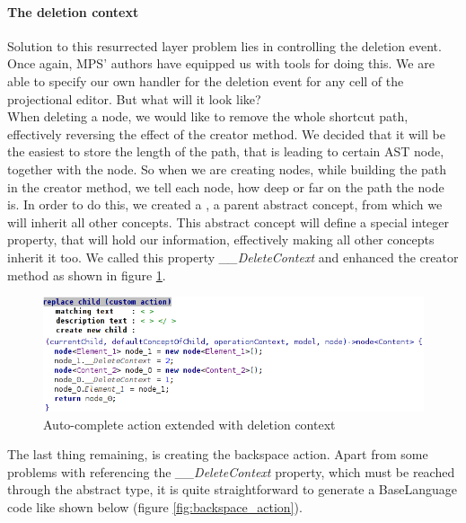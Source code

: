 \paragraph {The deletion context}

Solution to this resurrected layer problem lies in controlling the deletion event.
Once again, MPS' authors have equipped us with tools for doing this.
We are able to specify our own handler for the deletion event for any cell of the projectional editor.
But what will it look like?
\\

When deleting a node, we would like to remove the whole shortcut path, effectively reversing the effect of the creator method.
We decided that it will be the easiest to store the length of the path, that is leading to certain AST node, together with the node.
So when we are creating nodes, while building the path in the creator method, we tell each node, how deep or far on the path the node is.
In order to do this, we created a , a parent abstract concept, from which we will inherit all other concepts.
This abstract concept will define a special integer property, that will hold our information, effectively making all other concepts inherit it too.
We called this property \textit{{\_}{\_}DeleteContext} and enhanced the creator method as shown in figure \ref{fig:autocomplete_action_delete_context}.

\begin{figure}[h]
	\centering
	\includegraphics[width=\textwidth]{./img/autocomplete_action_delete_context.png}
	\caption{Auto-complete action extended with deletion context}
	\label{fig:autocomplete_action_delete_context}
\end{figure}

The last thing remaining, is creating the backspace action.
Apart from some problems with referencing the \textit{{\_}{\_}DeleteContext} property, which must be reached through the abstract  type, it is quite straightforward to generate a BaseLanguage code like shown below (figure \ref{fig:backspace_action}).

